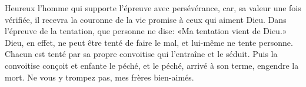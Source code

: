 Heureux l’homme qui supporte l’épreuve avec persévérance,
	car, sa valeur une fois vérifiée,
	il recevra la couronne de la vie promise à ceux qui aiment Dieu.
Dans l’épreuve de la tentation, que personne ne dise:
	«Ma tentation vient de Dieu.»
Dieu, en effet, ne peut être tenté de faire le mal, et lui-même ne tente personne.
Chacun est tenté par sa propre convoitise qui l’entraîne et le séduit.
	Puis la convoitise conçoit et enfante le péché,
	et le péché, arrivé à son terme, engendre la mort.
Ne vous y trompez pas, mes frères bien-aimés.
